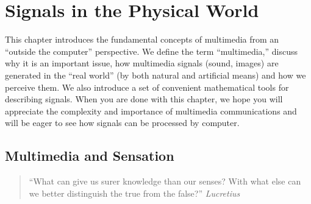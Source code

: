 
%
%
%
%
%
%
%
%
%
%
%
%

\chapter{Signals in the Physical World}
\label{ch:physical-signals}

This chapter introduces the fundamental concepts of multimedia from an
``outside the computer'' perspective. We define the term
``multimedia,'' discuss why it is an important issue, how multimedia
signals (sound, images) are generated in the ``real world'' (by both
natural and artificial means) and how we perceive them. We also
introduce a set of convenient mathematical tools for describing
signals. When you are done with this chapter, we hope you will
appreciate the complexity and importance of multimedia communications
and will be eager to see how signals can be processed by computer.

\section{Multimedia and Sensation}

\begin{quote}
``What can give us surer knowledge than our senses? With what else can
  we better distinguish the true from the false?'' \textit{Lucretius}
\end{quote}

